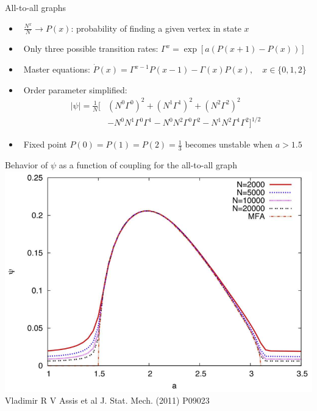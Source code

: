 \documentclass[serif,mathserif]{beamer}
\begin{document}
\begin{frame}
    All-to-all graphs
    \begin{itemize}
        \vspace{0.35cm}
        \item \ \pause $\frac{N^x}{N} \rightarrow P(x)$: probability of finding a given vertex in state $x$
        \vspace{0.35cm}
        \item \ \pause Only three possible transition rates: $\Gamma^x = \exp \left[ a (P(x+1) - P(x)) \right]$
        \vspace{0.35cm}
        \item \ \pause Master equations: $\dot P(x) = \Gamma^{x-1}P(x-1) - \Gamma(x)P(x), \quad x \in \{0, 1, 2\}$
        \vspace{0.35cm}
        \item \ \pause Order parameter simplified:\\
        \begin{equation*}
            \begin{split}
                |\psi| = \frac{1}{N} [
                & \left(N^0\Gamma^0\right)^2
                + \left(N^1\Gamma^1\right)^2
                + \left(N^2\Gamma^2\right)^2\\
                & - N^0N^1\Gamma^0\Gamma^1
                - N^0N^2\Gamma^0\Gamma^2
                - N^1N^2\Gamma^1\Gamma^2
            ]^{1/2}
            \end{split}
        \end{equation*}
        \vspace{0.35cm}
        \item \ \pause Fixed point $P(0) = P(1) = P(2) = \frac{1}{3}$ becomes unstable when $a>1.5$
    \end{itemize}
\end{frame}

\begin{frame}
    \centering
    Behavior of $\psi$ as a function of coupling for the all-to-all graph\\
    \vspace{0.8cm}
    \includegraphics[height=0.7\textheight]{psi-vs-a.eps}\\
    Vladimir R V Assis et al J. Stat. Mech. (2011) P09023
\end{frame}
\end{document}
